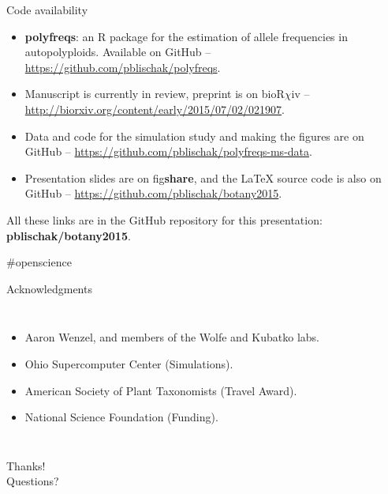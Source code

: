 \documentclass[presentation,sansserif]{beamer}
\begin{document}
\begin{frame}[t,plain]{Code availability}
	\fontsize{10pt}{10}\selectfont
	\begin{itemize}
		\item \textbf{polyfreqs}: an R package for the estimation of allele frequencies in autopolyploids. Available on GitHub -- \url{https://github.com/pblischak/polyfreqs}.
		\vspace{0.2in}

		\item Manuscript is currently in review, preprint is on bioR$\chi$iv -- \url{http://biorxiv.org/content/early/2015/07/02/021907}.
		\vspace{0.2in}

		\item Data and code for the simulation study and making the figures are on GitHub -- \url{https://github.com/pblischak/polyfreqs-ms-data}.
		\vspace{0.2in}

		\item Presentation slides are on fig\textbf{share}, and the \LaTeX{} source code is also on GitHub -- \url{https://github.com/pblischak/botany2015}.
	\end{itemize}
	\vspace{0.15in}

	{\Large \alert{All these links are in the GitHub repository for this presentation: \textbf{pblischak/botany2015}.}}

	\hfill {\tiny \#openscience}
\end{frame}

\begin{frame}[t,plain]{Acknowledgments}
	\begin{columns}[onlytextwidth]
	\begin{itemize}
		\item Aaron Wenzel, and members of the Wolfe and Kubatko labs.
		\item Ohio Supercomputer Center (Simulations).
		\item American Society of Plant Taxonomists (Travel Award).
		\item National Science Foundation (Funding).
	\end{itemize}

	\begin{center}
	\end{center}
	\end{columns}
\end{frame}

\begin{frame}[c,plain]{}
	\begin{center}
		{\Huge Thanks!}\\
		\vspace{0.5in}
		{\LARGE Questions?}
	\end{center}
\end{frame}
\end{document}
